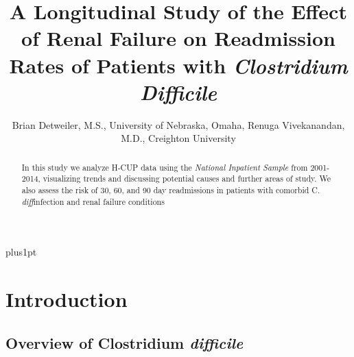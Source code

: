 \documentclass[12pt]{ociamthesis}\usepackage[]{graphicx}\usepackage[]{color}
\title{A Longitudinal Study of the Effect of Renal Failure on Readmission Rates of Patients with \textit{Clostridium Difficile}}
\author{Brian Detweiler, M.S., University of Nebraska, Omaha, Renuga Vivekanandan, M.D., Creighton University}
\newcommand{\cdifficile}{Clostridium \textit{difficile}}
\newcommand{\cdiff}{C. \textit{diff}}
\begin{document}
\baselineskip=18pt plus1pt

\setcounter{secnumdepth}{3}
\setcounter{tocdepth}{3}


\maketitle                  %

 


\begin{abstract}
In this study we analyze H-CUP data using the \textit{National Inpatient Sample} from 2001-2014, visualizing trends and 
discussing potential causes and further areas of study.
We also assess the risk of 30, 60, and 90 day readmissions in patients with comorbid \cdiff infection and renal failure conditions
\end{abstract}

\begin{romanpages}          %
\tableofcontents            %
\listoffigures              %
\listoftables
\end{romanpages}            %



















\chapter{Introduction}

\section{Overview of \cdifficile}
\end{document}
